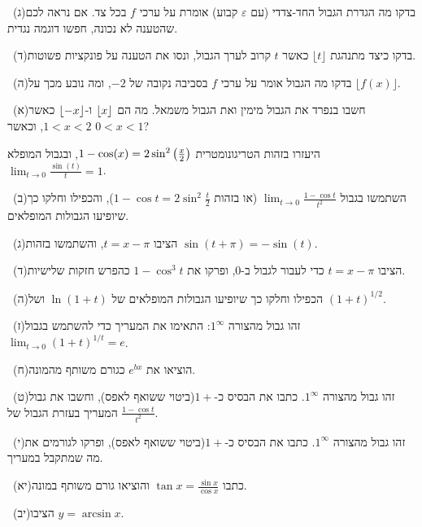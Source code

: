 \documentclass[12pt, a4paper]{article}
\begin{document}
\noindent {}\ (ג)\enskip בדקו מה הגדרת הגבול החד-צדדי (עם $\varepsilon$ קבוע) אומרת על ערכי $f$ בכל צד. אם נראה לכם שהטענה לא נכונה, חפשו דוגמה נגדית.\par\smallskip
\noindent {}\ (ד)\enskip בדקו כיצד מתנהגת $\lfloor t\rfloor$ כאשר $t$ קרוב לערך הגבול, ונסו את הטענה על פונקציות פשוטות.\par\smallskip
\noindent {}\ (ה)\enskip בדקו מה הגבול אומר על ערכי $f$ בסביבה נקובה של $-2$, ומה נובע מכך על $\lfloor f(x)\rfloor$.\par\smallskip
\noindent {}\ (א)\enskip חשבו בנפרד את הגבול מימין ואת הגבול משמאל. מה הם $\left\lfloor x\right\rfloor$ ו-$\left\lfloor-x\right\rfloor$ כאשר $1<x<2$, וכאשר $0<x<1$?\par\smallskip
\noindent {}\enskip היעזרו בזהות הטריגונומטרית $1-\cos(x)=2\sin^2\left(\frac x2\right)$, ובגבול המופלא $\lim_{t\to0}\frac{\sin(t)}{t}=1$.\par\smallskip
\noindent {}\ (ב)\enskip השתמשו בגבול $\lim_{t\to0}\frac{1-\cos t}{t^2}$ (או בזהות $1-\cos t=2\sin^2\frac t2$), והכפילו וחלקו כך שיופיעו הגבולות המופלאים.\par\smallskip
\noindent {}\ (ג)\enskip הציבו $t=x-\pi$, והשתמשו בזהות $\sin(t+\pi)=-\sin(t)$.\par\smallskip
\noindent {}\ (ד)\enskip הציבו $t=x-\pi$ כדי לעבור לגבול ב-$0$, ופרקו את $1-\cos^3t$ כהפרש חזקות שלישיות.\par\smallskip
\noindent {}\ (ה)\enskip הכפילו וחלקו כך שיופיעו הגבולות המופלאים של $\ln(1+t)$ ושל $(1+t)^{1/2}$.\par\smallskip
\noindent {}\ (ז)\enskip זהו גבול מהצורה $1^\infty$: התאימו את המעריך כדי להשתמש בגבול $\lim_{t\to0}(1+t)^{1/t}=e$.\par\smallskip
\noindent {}\ (ח)\enskip הוציאו את $e^{bx}$ כגורם משותף מהמונה.\par\smallskip
\noindent {}\ (ט)\enskip זהו גבול מהצורה $1^\infty$. כתבו את הבסיס כ-$1+$(ביטוי ששואף לאפס), וחשבו את גבול המעריך בעזרת הגבול של $\frac{1-\cos t}{t^2}$.\par\smallskip
\noindent {}\ (י)\enskip זהו גבול מהצורה $1^\infty$. כתבו את הבסיס כ-$1+$(ביטוי ששואף לאפס), ופרקו לגורמים את מה שמתקבל במעריך.\par\smallskip
\noindent {}\ (יא)\enskip כתבו $\tan x=\frac{\sin x}{\cos x}$ והוציאו גורם משותף במונה.\par\smallskip
\noindent {}\ (יב)\enskip הציבו $y=\arcsin x$.\par\smallskip
\end{document}
